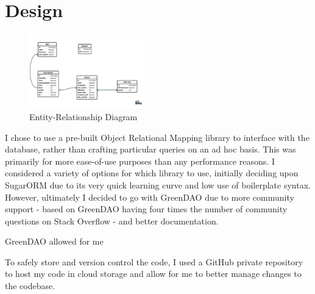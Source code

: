 \chapter{Design}

\begin{figure}[t]
	\centering
	\includegraphics[width=0.45\textwidth]{images/entityRelationshipDiagram.png}
	\caption{Entity-Relationship Diagram}
	\label{fig:ERD}
\end{figure}

I chose to use a pre-built Object Relational Mapping library to interface with the database, rather than crafting particular queries on an ad hoc basis.
This was primarily for more ease-of-use purposes than any performance reasons. 
I considered a variety of options for which library to use, initially deciding upon SugarORM due to its very quick learning curve and low use of boilerplate syntax. 
However, ultimately I decided to go with GreenDAO \citep{greendao} due to more community support - based on GreenDAO having four times the number of community questions on Stack Overflow - and better documentation.

GreenDAO allowed for me 

To safely store and version control the code, I used a GitHub private repository to host my code in cloud storage and allow for me to better manage changes to the codebase.

